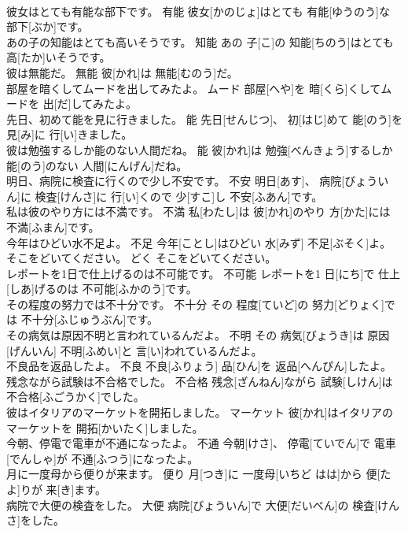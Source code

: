 \documentclass[8pt]{extreport}
\begin{document}
\begin{CJK}{UTF8}{min}
\\	彼女はとても有能な部下です。	有能	彼女[かのじょ]はとても 有能[ゆうのう]な 部下[ぶか]です。	
\\	あの子の知能はとても高いそうです。	知能	あの 子[こ]の 知能[ちのう]はとても 高[たか]いそうです。	
\\	彼は無能だ。	無能	彼[かれ]は 無能[むのう]だ。	
\\	部屋を暗くしてムードを出してみたよ。	ムード	部屋[へや]を 暗[くら]くしてムードを 出[だ]してみたよ。	
\\	先日、初めて能を見に行きました。	能	先日[せんじつ]、 初[はじ]めて 能[のう]を 見[み]に 行[い]きました。	
\\	彼は勉強するしか能のない人間だね。	能	彼[かれ]は 勉強[べんきょう]するしか 能[のう]のない 人間[にんげん]だね。	
\\	明日、病院に検査に行くので少し不安です。	不安	明日[あす]、 病院[びょういん]に 検査[けんさ]に 行[い]くので 少[すこ]し 不安[ふあん]です。	
\\	私は彼のやり方には不満です。	不満	私[わたし]は 彼[かれ]のやり 方[かた]には 不満[ふまん]です。	
\\	今年はひどい水不足よ。	不足	今年[ことし]はひどい 水[みず] 不足[ぶそく]よ。	
\\	そこをどいてください。	どく	そこをどいてください。	
\\	レポートを1日で仕上げるのは不可能です。	不可能	レポートを1 日[にち]で 仕上[しあ]げるのは 不可能[ふかのう]です。	
\\	その程度の努力では不十分です。	不十分	その 程度[ていど]の 努力[どりょく]では 不十分[ふじゅうぶん]です。	
\\	その病気は原因不明と言われているんだよ。	不明	その 病気[びょうき]は 原因[げんいん] 不明[ふめい]と 言[い]われているんだよ。	
\\	不良品を返品したよ。	不良	不良[ふりょう] 品[ひん]を 返品[へんぴん]したよ。	
\\	残念ながら試験は不合格でした。	不合格	残念[ざんねん]ながら 試験[しけん]は 不合格[ふごうかく]でした。	
\\	彼はイタリアのマーケットを開拓しました。	マーケット	彼[かれ]はイタリアのマーケットを 開拓[かいたく]しました。	
\\	今朝、停電で電車が不通になったよ。	不通	今朝[けさ]、 停電[ていでん]で 電車[でんしゃ]が 不通[ふつう]になったよ。	
\\	月に一度母から便りが来ます。	便り	月[つき]に 一度母[いちど はは]から 便[たよ]りが 来[き]ます。	
\\	病院で大便の検査をした。	大便	病院[びょういん]で 大便[だいべん]の 検査[けんさ]をした。	

\end{CJK}
\end{document}
